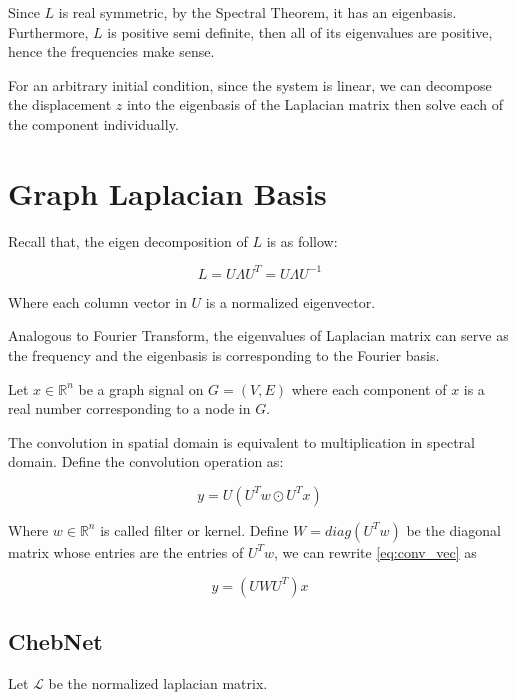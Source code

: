 \documentclass{article}
\begin{document}
    Since $L$ is real symmetric, by the Spectral Theorem, it has an eigenbasis. Furthermore, $L$ is positive semi definite, then all of its eigenvalues are positive, hence the frequencies make sense.

    For an arbitrary initial condition, since the system is linear, we can decompose the displacement $z$ into the eigenbasis of the Laplacian matrix then solve each of the component individually.


    \section{Graph Laplacian Basis}

    Recall that, the eigen decomposition of $L$ is as follow:

    \begin{equation}
        L = U \Lambda U^T = U \Lambda U^{-1}
    \end{equation}

    Where each column vector in $U$ is a normalized eigenvector.

    Analogous to Fourier Transform, the eigenvalues of Laplacian matrix can serve as the frequency and the eigenbasis is corresponding to the Fourier basis.

    Let $x \in \mathbb{R}^n$ be a graph signal on $G = (V, E)$ where each component of $x$ is a real number corresponding to a node in $G$.

    The convolution in spatial domain is equivalent to multiplication in spectral domain. Define the convolution operation as:

    \begin{equation}
        y =  U ( U^T w \odot U^T x )
        \label{eq:conv_vec}
    \end{equation}

    Where $w \in \mathbb{R}^n$ is called filter or kernel. Define $W = diag(U^T w)$ be the diagonal matrix whose entries are the entries of $U^T w$, we can rewrite \ref{eq:conv_vec} as

    \begin{equation}
        y =  (U W U^T) x
    \end{equation}

    \subsection{ChebNet}


    Let $\mathcal{L}$ be the normalized laplacian matrix.
\end{document}

